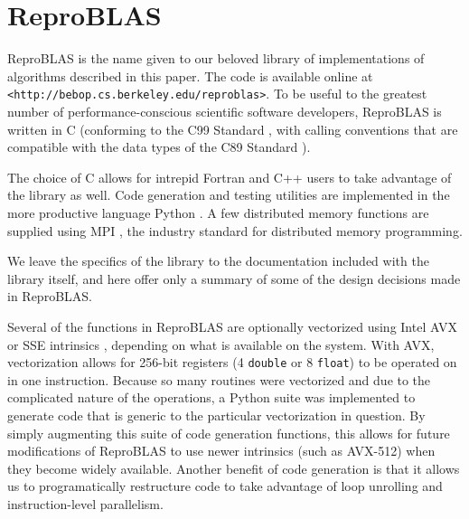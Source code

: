 \section{ReproBLAS}
  \label{sec:reproBLAS}
  ReproBLAS is the name given to our beloved library of implementations of algorithms described in this paper.
  The code is available online at \texttt{<http://bebop.cs.berkeley.edu/reproblas>}.
  To be useful to the greatest number of performance-conscious scientific software developers, ReproBLAS is written in C (conforming to the C99 Standard \cite{c99}, with calling conventions that are compatible with the data types of the C89 Standard \cite{c89}).
\begin{comment}
 complex types \cite{c89} as discussed in \cite{cblasinterface}
Because the C89 standard did not standardize the complex floating point type, all interfaces refer to complex types using \texttt{void*} pointers. If a function would normally return a complex type, a \texttt{void*} pointer is added as the last argument and the function name is suffixed by \texttt{_sub}
\end{comment}
  The choice of C allows for intrepid Fortran and C++ users to take advantage of the library as well.
  Code generation and testing utilities are implemented in the more productive language Python \cite{Python}.
  A few distributed memory functions are supplied using MPI \cite{MPI}, the industry standard for distributed memory programming.

  We leave the specifics of the library to the documentation included with the library itself, and here offer only a summary of some of the design decisions made in ReproBLAS.

  Several of the functions in ReproBLAS are optionally vectorized using Intel AVX or SSE intrinsics \cite{SSEAVX}, depending on what is available on the system. With AVX, vectorization allows for 256-bit registers (4 \texttt{double} or 8 \texttt{float}) to be operated on in one instruction. Because so many routines were vectorized and due to the complicated nature of the operations, a Python suite was implemented to generate code that is generic to the particular vectorization in question. By simply augmenting this suite of code generation functions, this allows for future modifications of ReproBLAS to use newer intrinsics (such as AVX-512) when they become widely available. Another benefit of code generation is that it allows us to programatically restructure code to take advantage of loop unrolling and instruction-level parallelism.

